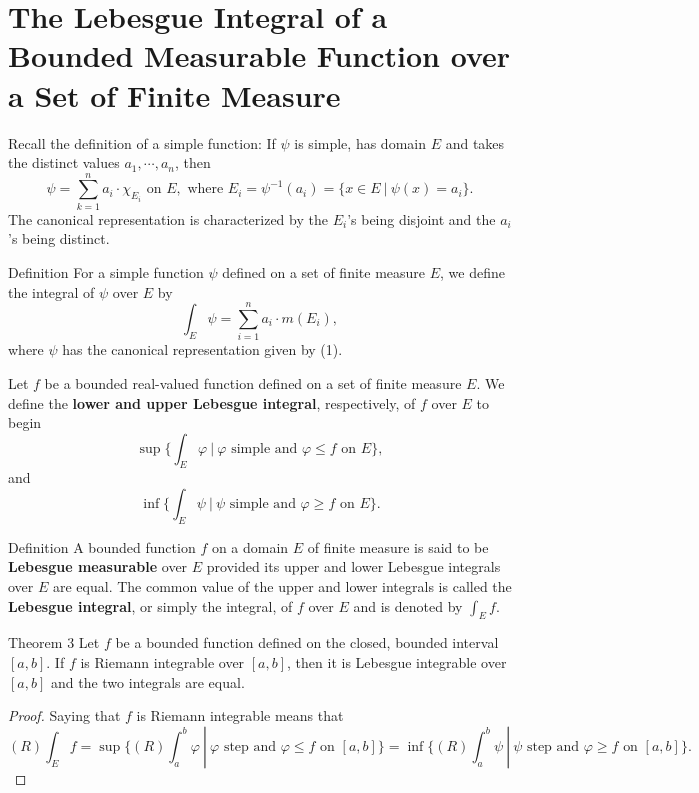 \section{The Lebesgue Integral of a Bounded Measurable Function over a Set of Finite Measure}
\begin{flushleft}
    Recall the definition of a simple function:
    If $\psi$ is simple, has domain $E$ and takes the distinct values $a_1,\cdots,a_n$, then
    \begin{equation}
        \psi=\sum_{k=1}^n a_i\cdot\chi_{E_i}\text{ on }E,\text{ where }E_i=\psi^{-1}(a_i)=\{x\in E\ |\ \psi(x)=a_i\}.\tag{1}   
    \end{equation}
    The canonical representation is characterized by the $E_i$'s being disjoint and the $a_i$'s being distinct.
    \begin{namedthm*}{Definition}
        For a simple function $\psi$ defined on a set of finite measure $E$, we define the integral of $\psi$ over $E$ by
        \[
            \int_E\psi=\sum_{i=1}^n a_i\cdot m(E_i),
        \]
        where $\psi$ has the canonical representation given by (1).
    \end{namedthm*}
    Let $f$ be a bounded real-valued function defined on a set of finite measure $E$.
    We define the \textbf{lower and upper Lebesgue integral}, respectively, of $f$ over $E$ to begin
    \[
        \sup\biggl\{\int_E\varphi\ |\ \varphi\text{ simple and }\varphi\le f\text{ on }E\biggr\},
    \]
    and
    \[
        \inf\biggl\{\int_E\psi\ |\ \psi\text{ simple and }\varphi\ge f\text{ on }E\biggr\}.
    \]
    \begin{namedthm*}{Definition}
        A bounded function $f$ on a domain $E$ of finite measure is said to be \textbf{Lebesgue measurable} over $E$ provided its upper and lower Lebesgue integrals over $E$ are equal.
        The common value of the upper and lower integrals is called the \textbf{Lebesgue integral}, or simply the integral, of $f$ over $E$ and is denoted by $\int_Ef$.
    \end{namedthm*}
    \begin{namedthm*}{Theorem 3}    
        Let $f$ be a bounded function defined on the closed, bounded interval $[a,b]$.
        If $f$ is Riemann integrable over $[a,b]$, then it is Lebesgue integrable over $[a,b]$ and the two integrals are equal.
    \end{namedthm*}
    \begin{proof}
        Saying that $f$ is Riemann integrable means that
        \[
            (R)\int_Ef=\sup\biggl\{(R)\int_a^b\varphi\ |\ \varphi\text{ step and }\varphi\le f\text{ on }[a,b]\biggr\}=\inf\biggl\{(R)\int_a^b\psi\ |\ \psi\text{ step and }\varphi\ge f\text{ on }[a,b]\biggr\}.
\]
\end{proof}
\end{flushleft}
